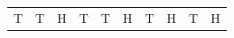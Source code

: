{{\begin{center}
\begin{xtabular}[t]{|l|l|l|l|l|l|l|l|l|l|}
    
        T &
    
    
        T &
    
    
        H &
    
    
        T &
    
    
        T &
    
    
        H &
    
    
        T &
    
    
        H &
    
    
        T &
    
    
        H%
     \tabularnewline{}
    

\end{xtabular}
\end{center}}}
